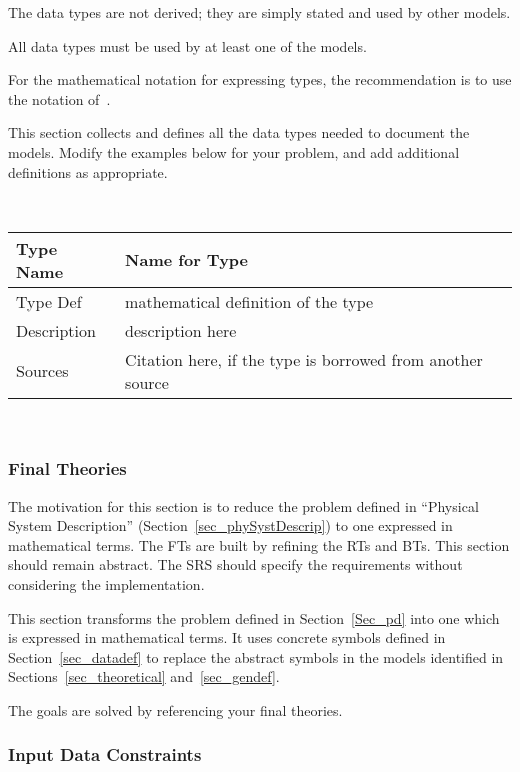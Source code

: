 \documentclass[12pt]{article}
\newcommand{\colAwidth}{0.13\textwidth}
\newcommand{\colBwidth}{0.82\textwidth}
\begin{document}
The data types are not derived; they are simply stated and used by other models.

All data types must be used by at least one of the models.

For the mathematical notation for expressing types, the recommendation is to use
the notation of~\citet{HoffmanAndStrooper1995}.

This section collects and defines all the data types needed to document the
models. Modify the examples below for your problem, and add additional
definitions as appropriate.

~\newline

\noindent
\begin{minipage}{\textwidth}
\renewcommand*{\arraystretch}{1.5}
\begin{tabular}{| p{\colAwidth} | p{\colBwidth}|}
  \hline
  \rowcolor[gray]{0.9}
  Type Name & Name for Type\\
  \hline
  Type Def & mathematical definition of the type\\
  \hline
  Description & description here
  \\
  \hline
  Sources & Citation here, if the type is borrowed from another source\\
  \hline
\end{tabular}
\end{minipage}\\

\subsubsection{Final Theories} \label{sec_instance}    

The motivation for this section is to reduce the problem defined in ``Physical
System Description'' (Section~\ref{sec_phySystDescrip}) to one expressed in
mathematical terms. The FTs are built by refining the RTs and BTs.  This
section should remain abstract.  The SRS should specify the requirements without
considering the implementation.

This section transforms the problem defined in Section~\ref{Sec_pd} into 
one which is expressed in mathematical terms. It uses concrete symbols defined 
in Section~\ref{sec_datadef} to replace the abstract symbols in the models 
identified in Sections~\ref{sec_theoretical} and~\ref{sec_gendef}.

The goals are solved by referencing your final theories.

\subsubsection{Input Data Constraints} \label{sec_DataConstraints}    
\end{document}
